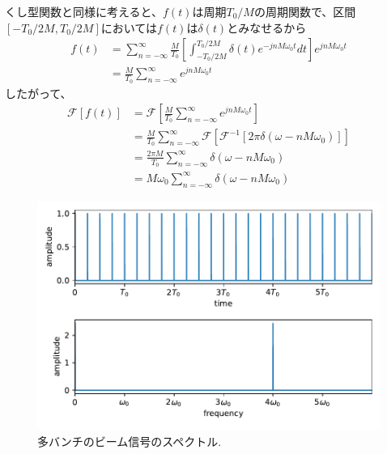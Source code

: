 \documentclass[]{jlreq}
\theoremstyle{definition}
\begin{document}
くし型関数と同様に考えると、$f(t)$は周期$T_0/M$の周期関数で、区間$[-T_0/2M, T_0/2M]$においては$f(t)$は$\delta(t)$とみなせるから
%
%
\begin{align}
  f(t) &= \sum_{n = -\infty}^{\infty} \frac{M}{T_0} \left[\int_{-T_0/2M}^{T_0/2M}\delta (t) e^{-j n M \omega_0 t} dt\right] 
  e^{j n M \omega_0 t} \\
              &= \frac{M}{T_0} \sum_{n = -\infty}^{\infty} e^{j n M \omega_0 t} 
\end{align}
%
したがって、
%
\begin{align}
  \mathcal{F}[f(t)] &= \mathcal{F}\left[\frac{M}{T_0} \sum_{n = -\infty}^{\infty} e^{j n M \omega_0 t}\right] \\ 
      & = \frac{M}{T_0} \sum_{n = -\infty}^{\infty} \mathcal{F}[\mathcal{F}^{-1}[2\pi \delta(\omega - n M \omega_0)]] \\ 
      & = \frac{2 \pi M}{T_0} \sum_{n = -\infty}^{\infty} \delta(\omega - n M \omega_0)\\ 
      &= M \omega_0 \sum_{n = -\infty}^{\infty} \delta(\omega - n M \omega_0)
\end{align}
%
\begin{figure}[hbt]
  \begin{center}
    \includegraphics[width=12cm,clip]{multi_bunch.pdf}
    \caption{多バンチのビーム信号のスペクトル.}
   \label{multi_bunch}
  \end{center}
\end{figure}
%
\end{document}
